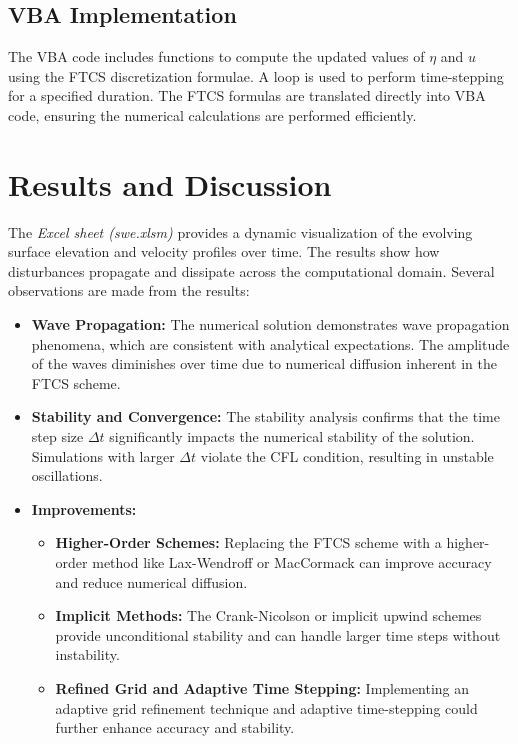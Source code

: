 \documentclass[12pt]{article}
\begin{document}
\subsection{VBA Implementation}
The VBA code includes functions to compute the updated values of \( \eta \) and \( u \) using the FTCS discretization formulae. A loop is used to perform time-stepping for a specified duration. The FTCS formulas are translated directly into VBA code, ensuring the numerical calculations are performed efficiently.

\section{Results and Discussion}

The \textit{Excel sheet (swe.xlsm)} provides a dynamic visualization of the evolving surface elevation and velocity profiles over time. The results show how disturbances propagate and dissipate across the computational domain. Several observations are made from the results:

\begin{itemize}
    \item \textbf{Wave Propagation:} The numerical solution demonstrates wave propagation phenomena, which are consistent with analytical expectations. The amplitude of the waves diminishes over time due to numerical diffusion inherent in the FTCS scheme.
    
    \item \textbf{Stability and Convergence:} The stability analysis confirms that the time step size \( \Delta t \) significantly impacts the numerical stability of the solution. Simulations with larger \( \Delta t \) violate the CFL condition, resulting in unstable oscillations.
    
    \item \textbf{Improvements:}
    \begin{itemize}
        \item \textbf{Higher-Order Schemes:} Replacing the FTCS scheme with a higher-order method like Lax-Wendroff or MacCormack can improve accuracy and reduce numerical diffusion.
        
        \item \textbf{Implicit Methods:} The Crank-Nicolson or implicit upwind schemes provide unconditional stability and can handle larger time steps without instability.
        
        \item \textbf{Refined Grid and Adaptive Time Stepping:} Implementing an adaptive grid refinement technique and adaptive time-stepping could further enhance accuracy and stability.
    \end{itemize}
\end{itemize}
\end{document}
